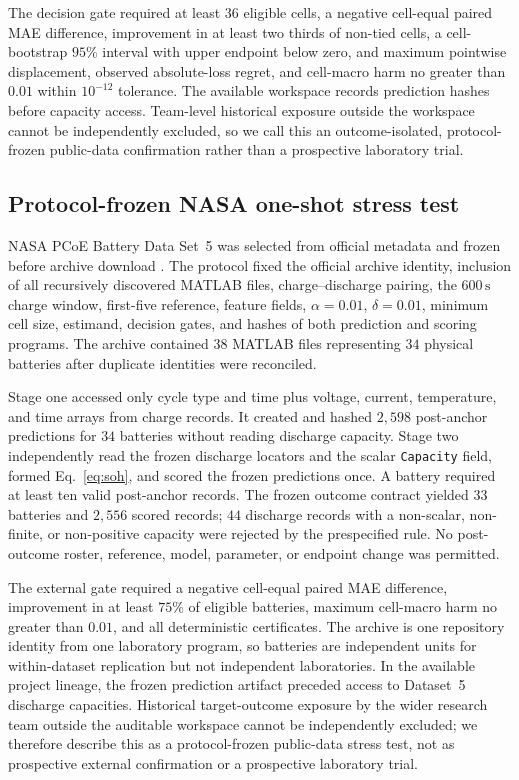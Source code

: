 \documentclass[11pt]{article}
\begin{document}
The decision gate required at least $36$ eligible cells, a negative cell-equal paired MAE difference, improvement in at least two thirds of non-tied cells, a cell-bootstrap $95\%$ interval with upper endpoint below zero, and maximum pointwise displacement, observed absolute-loss regret, and cell-macro harm no greater than $0.01$ within $10^{-12}$ tolerance. The available workspace records prediction hashes before capacity access. Team-level historical exposure outside the workspace cannot be independently excluded, so we call this an outcome-isolated, protocol-frozen public-data confirmation rather than a prospective laboratory trial.

\subsection{Protocol-frozen NASA one-shot stress test}

NASA PCoE Battery Data Set~5 was selected from official metadata and frozen before archive download \citep{saha2007nasa}. The protocol fixed the official archive identity, inclusion of all recursively discovered MATLAB files, charge--discharge pairing, the $600\,\mathrm{s}$ charge window, first-five reference, feature fields, $\alpha=0.01$, $\delta=0.01$, minimum cell size, estimand, decision gates, and hashes of both prediction and scoring programs. The archive contained $38$ MATLAB files representing $34$ physical batteries after duplicate identities were reconciled.

Stage one accessed only cycle type and time plus voltage, current, temperature, and time arrays from charge records. It created and hashed $2{,}598$ post-anchor predictions for $34$ batteries without reading discharge capacity. Stage two independently read the frozen discharge locators and the scalar \texttt{Capacity} field, formed Eq.~\eqref{eq:soh}, and scored the frozen predictions once. A battery required at least ten valid post-anchor records. The frozen outcome contract yielded $33$ batteries and $2{,}556$ scored records; $44$ discharge records with a non-scalar, non-finite, or non-positive capacity were rejected by the prespecified rule. No post-outcome roster, reference, model, parameter, or endpoint change was permitted.

The external gate required a negative cell-equal paired MAE difference, improvement in at least $75\%$ of eligible batteries, maximum cell-macro harm no greater than $0.01$, and all deterministic certificates. The archive is one repository identity from one laboratory program, so batteries are independent units for within-dataset replication but not independent laboratories. In the available project lineage, the frozen prediction artifact preceded access to Dataset~5 discharge capacities. Historical target-outcome exposure by the wider research team outside the auditable workspace cannot be independently excluded; we therefore describe this as a protocol-frozen public-data stress test, not as prospective external confirmation or a prospective laboratory trial.
\end{document}
